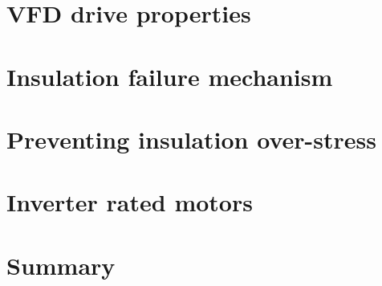 \section{VFD drive properties}

\section{Insulation failure mechanism}

\section{Preventing insulation over-stress}


\section{Inverter rated motors}








\section{Summary}








\



%

